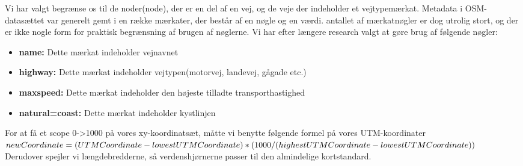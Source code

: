 Vi har valgt begrænse os til de noder(node), der er en del af en vej, og de veje der indeholder et vejtypemærkat. Metadata i OSM-datasættet var generelt gemt i en række mærkater, der består af en nøgle og en værdi. antallet af mærkatnøgler er dog utrolig stort, og der er ikke nogle form for praktisk begrænsning af brugen af nøglerne. Vi har efter længere research valgt at gøre brug af følgende nøgler:

\begin{itemize}
	\item \textbf{name:} Dette mærkat indeholder vejnavnet
	\item \textbf{highway:} Dette mærkat indeholder vejtypen(motorvej, landevej, gågade etc.)
	\item \textbf{maxspeed:} Dette mærkat indeholder den højeste tilladte transporthastighed
	\item \textbf{natural=coast:} Dette mærkat indeholder kystlinjen
\end{itemize}
For at få et scope 0->1000 på vores xy-koordinatsæt, måtte vi benytte følgende formel på vores UTM-koordinater $newCoordinate = \\(UTMCoordinate-lowestUTMCoordinate) * (1000/(highestUTMCoordinate-lowestUTMCoordinate)) $\\ Derudover spejler vi længdebredderne, så verdenshjørnerne passer til den almindelige kortstandard.
